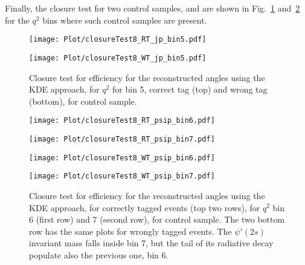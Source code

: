Finally, the closure test for two control samples, \BKsJ and \BKsPsip are shown
in Fig.~\ref{fig:clKDEJpsi} and~\ref{fig:clKDEpsip} for the $q^2$ bins where
such control samples are present.

\begin{figure}[hbt]
    \texttt{[image: Plot/closureTest8\_RT\_jp\_bin5.pdf]}

    \texttt{[image: Plot/closureTest8\_WT\_jp\_bin5.pdf]}

    \caption{Closure test for efficiency for the reconstructed angles
        using the KDE approach, for $q^2$ for bin 5, correct tag (top) and wrong tag (bottom), for \BKsJ control sample.}
    \label{fig:clKDEJpsi}
\end{figure}

\begin{figure}[hbt]
    \texttt{[image: Plot/closureTest8\_RT\_psip\_bin6.pdf]}

    \texttt{[image: Plot/closureTest8\_RT\_psip\_bin7.pdf]}

    \texttt{[image: Plot/closureTest8\_WT\_psip\_bin6.pdf]}

    \texttt{[image: Plot/closureTest8\_WT\_psip\_bin7.pdf]}

    \caption{Closure test for efficiency for the reconstructed angles
        using the KDE approach, for correctly tagged events (top two rows), for
        $q^2$ bin 6 (first row) and 7 (second row), for \BKsPsip control
        sample.
        The two bottom row has the same plots for wrongly tagged events.
        The $\psi'(2s)$ invariant mass falls inside bin 7, but the tail of its
        radiative decay populate also the previous one, bin 6.}
    \label{fig:clKDEpsip}
\end{figure}
